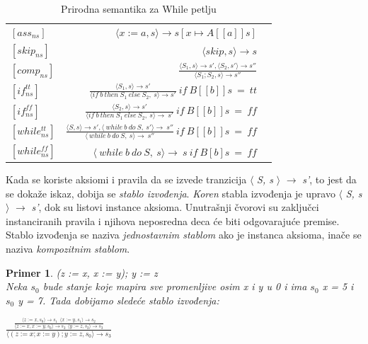 \documentclass[a4paper]{article}
\newtheorem{primer}{Primer}[section]
\begin{document}
{\begin{table}[h]
       \caption{Prirodna semantika za While petlju}
    	\begin{center}
        \begin{tabular}{lrc}\hline
        \hline
        \hline
        $[ass_{ns}] $ & $ \langle x := a, s \rangle \rightarrow s[x \mapsto A[[a]]s]$    \\  [6pt]
        $[skip_{ns}] $ & $ \langle skip, s \rangle \rightarrow s$   \\ [6pt]
         $[comp_{ns}] $ & $ \frac{\langle S_1, s \rangle \rightarrow s', \langle S_2, s' \rangle \rightarrow s''}{\langle S_1;S_2, s \rangle \rightarrow s''}$ \\[6pt]
            $[if^{tt}_{ns}] $ & $ \frac{\langle S_1, s \rangle \rightarrow s'}{\langle if\ b\ then\ S_1\ else\ S_2,\ s \rangle \rightarrow s'}\  if\ B[[b]]s\ =\ tt $ \\ [6pt]
            $[if^{ff}_{ns}] $ & $ \frac{\langle S_2, s \rangle \rightarrow s'}{\langle if\ b\ then\ S_1\ else\ S_2,\ s \rangle \rightarrow\ s'}\  if\ B[[b]]s\ =\ ff $ \\ [6pt]
            $[while^{tt}_{ns}] $ & $ \frac{\langle S, s \rangle \rightarrow s', \langle\ while\ b\ do\ S,\ s' \rangle \rightarrow\ s''}{\langle\ while\ b\ do\ S,\ s \rangle \rightarrow\ s''}\ if\ B[[b]]s\ =\ ff $ \\ [6pt]
             $[while^{ff}_{ns}] $ & $ \langle\ while\ b\ do\ S,\ s \rangle \rightarrow\ s\ if\ B[b]s\ =\ ff$ \\ [6pt]
          \hline \hline
        \end{tabular}
     \label{tab:b}
    \end{center}
\end{table}

Kada se koriste aksiomi i pravila da se izvede tranzicija $\langle$ \textit{S, s} $\rangle$ $\rightarrow$ \textit{s'}, to jest da se dokaže iskaz, dobija se \textit{stablo izvođenja}. \textit{Koren} stabla izvođenja je upravo $\langle$ \textit{S, s} $\rangle$ $\rightarrow$ \textit{s'}, dok su listovi instance aksioma. Unutrašnji čvorovi su zaključci instanciranih pravila i njihova neposredna deca će biti odgovarajuće premise. Stablo izvođenja se naziva \textit{jednostavnim stablom} ako je instanca aksioma, inače se naziva \textit{kompozitnim stablom}.\\

\begin{primer}
(z := x, x := y); y := z \\
Neka $s_0$ bude stanje koje mapira sve promenljive osim x i y u 0 i ima $s_0$ x = 5 i $s_0$ y = 7. Tada dobijamo sledeće stablo izvođenja:
\end{primer}
{\Large\begin{center}$\frac{\frac{\langle z := x, s_0 \rangle \rightarrow s_1\ \ \langle x := y, s_1 \rangle \rightarrow s_2}{\langle z := x, x := y, s_0\rangle \rightarrow s_2\ \ \langle y := z, s_2 \rangle \rightarrow s_3}}{\langle (z := x; x := y); y := z, s_0 \rangle \rightarrow s_3}$ \end{center}}

}
\end{document}
